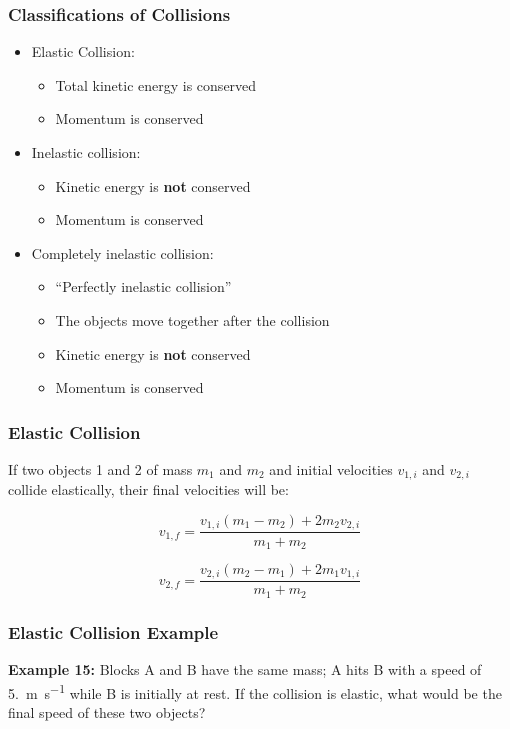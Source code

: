 \documentclass[12pt,compress,aspectratio=169]{beamer}
\begin{document}
\begin{frame}
  \frametitle{Classifications of Collisions}
  \begin{itemize}
  \item Elastic Collision:
    \begin{itemize}
    \item Total kinetic energy is conserved
    \item<alert@2> Momentum is conserved
    \end{itemize}
  \item Inelastic collision:
    \begin{itemize}
    \item Kinetic energy is \textbf{not} conserved
    \item<alert@2> Momentum is conserved
    \end{itemize}
  \item Completely inelastic collision:
    \begin{itemize}
    \item ``Perfectly inelastic collision''
    \item The objects move together after the collision
    \item Kinetic energy is \textbf{not} conserved
    \item<alert@2> Momentum is conserved
    \end{itemize}
  \end{itemize}
\end{frame}

\begin{frame}
  \frametitle{Elastic Collision}
  If two objects 1 and 2 of mass $m_1$ and $m_2$ and initial velocities
  $v_{1,i}$ and $v_{2,i}$ collide elastically, their final velocities will be:
  
  {\Large
    \begin{displaymath}
      v_{1,f}=\frac{v_{1,i}(m_1-m_2)+2m_2v_{2,i}}{m_1+m_2}
    \end{displaymath}
    
    \begin{displaymath}
      v_{2,f}=\frac{v_{2,i}(m_2-m_1)+2m_1v_{1,i}}{m_1+m_2}
    \end{displaymath}
  }
\end{frame}

\begin{frame}
  \frametitle{Elastic Collision Example}

  \textbf{Example 15:} Blocks A and B have the same mass; A hits B with a speed
  of \SI{5.}{\metre\per\second} while B is initially at rest. If the collision
  is elastic, what would be the final speed of these two objects?
\end{frame}
\end{document}
